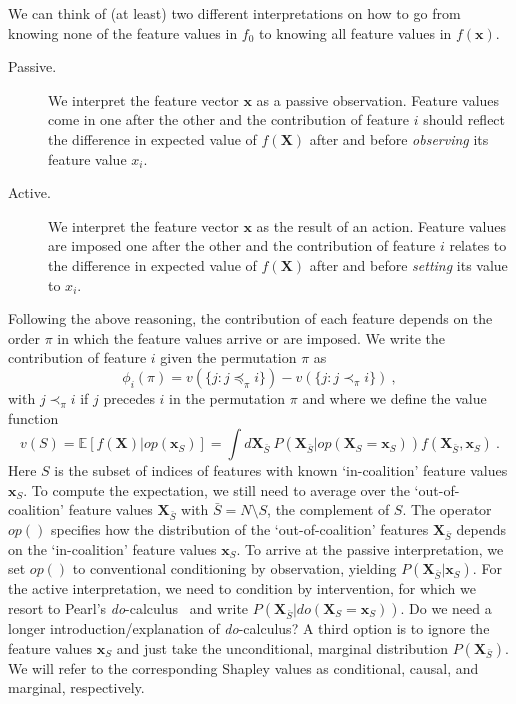 \documentclass{article}
\newcommand{\vX}{\mathbf{X}}
\newcommand{\vx}{\mathbf{x}}
\newcommand{\expectation}{\mathbb{E}}
\newcommand{\contribution}{{\phi}}
\newcommand{\val}{{v}}
\newcommand{\dodo}{\mathit{do}}
\newcommand{\lvdo}[1]{\dodo(\vX_{#1} = \vx_{#1})}
\newcommand{\perm}{\pi}
\newcommand{\operator}{\mathit{op}}
\newcommand{\svop}[1]{\operator(\vx_{#1})}
\newcommand{\lvop}[1]{\operator(\vX_{#1} = \vx_{#1})}
\newcommand{\allfeatures}{{N}}
\newcommand{\comment}[1]{{\color{red} #1}}
\begin{document}
We can think of (at least) two different interpretations on how to go from knowing none of the feature values in $f_0$ to knowing all feature values in $f(\vx)$.
\begin{description}
	\item[Passive.] We interpret the feature vector $\vx$ as a passive observation. Feature values come in one after the other and the contribution of feature $i$ should reflect the difference in expected value of $f(\vX)$ after and before {\em observing} its feature value $x_i$.
	\item[Active.] We interpret the feature vector $\vx$ as the result of an action. Feature values are imposed one after the other and the contribution of feature $i$ relates to the difference in expected value of $f(\vX)$ after and before {\em setting} its value to $x_i$.
\end{description}
Following the above reasoning, the contribution of each feature  depends on the order $\perm$ in which the feature values arrive or are imposed. We write the contribution of feature $i$ given the permutation $\perm$ as
\begin{equation}
\contribution_i(\perm) = \val(\{j: j \preceq_\perm i\}) - \val(\{j: j \prec_\perm i\}) \: ,
\label{eq:contperm}
\end{equation}
with $j \prec_\perm i$ if $j$ precedes $i$ in the permutation $\perm$ and where we define the value function
\begin{equation}
\val(S) = \expectation \left[f(\vX) | \svop{S} \right] = \int d\vX_{\bar{S}} \: P(\vX_{\bar{S}}|\lvop{S}) f(\vX_{\bar{S}},\vx_S) \: .
\label{eq:valuedef}
\end{equation}
Here $S$ is the subset of indices of features with known `in-coalition' feature values $\vx_S$. To compute the expectation, we still need to average over the `out-of-coalition' feature values $\vX_{\bar{S}}$ with $\bar{S} = \allfeatures \setminus S$, the complement of $S$. The operator $\operator()$ specifies how the distribution of the `out-of-coalition' features $\vX_{\bar{S}}$ depends on the `in-coalition' feature values $\vx_{S}$. To arrive at the passive interpretation, we set $\operator()$ to conventional conditioning by observation, yielding $P(\vX_{\bar{S}}|\vx_{S})$. For the active interpretation, we need to condition by intervention, for which we resort to Pearl's \textit{do}-calculus~\cite{pearl1995causal} and write $P(\vX_{\bar{S}}|\lvdo{S})$. \comment{Do we need a longer introduction/explanation of \textit{do}-calculus?} A third option is to ignore the feature values $\vx_S$ and just take the unconditional, marginal distribution $P(\vX_{\bar{S}})$. We will refer to the corresponding Shapley values as conditional, causal, and marginal, respectively.
\end{document}
